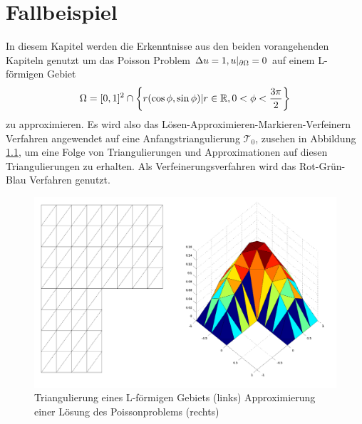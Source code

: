 \chapter{Fallbeispiel}
In diesem Kapitel werden die Erkenntnisse aus den beiden vorangehenden Kapiteln genutzt um das Poisson Problem $\Delta u = 1, u|_{\partial \Omega} = 0$ auf einem L-förmigen Gebiet   
\[
\Omega = [0,1]^2 \cap \left\{ r(\cos\phi,\sin\phi)| r\in\mathbb{R},0<\phi<\frac{3 \pi}{2} \right\}
\] 
zu approximieren. Es wird also das Lösen-Approximieren-Markieren-Verfeinern Verfahren angewendet auf eine Anfangstriangulierung $\mathscr{T}_0$, zusehen in Abbildung \ref{grid}, um eine Folge von Triangulierungen und Approximationen auf diesen Triangulierungen zu erhalten. Als Verfeinerungsverfahren wird das Rot-Grün-Blau Verfahren genutzt.

\begin{figure}[!htbp]
	\begin{center}
		\includegraphics[width=13cm]{pics/nonref.png}
	\end{center}
	\caption{\label{grid}Triangulierung eines L-förmigen Gebiets (links) Approximierung einer Lösung des Poissonproblems (rechts)}
\end{figure}

